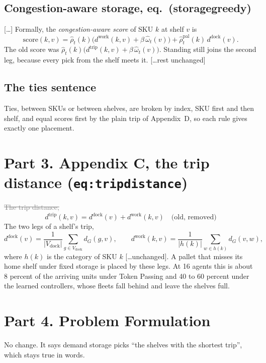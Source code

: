 \documentclass[11pt,a4paper]{article}
\newcommand{\new}[1]{\textcolor{newc}{#1}}
\newcommand{\old}[1]{\textcolor{gray}{\sout{#1}}}
\newenvironment{greenblock}{\color{newc}}{}
\begin{document}
\subsection*{Congestion-aware storage, eq.~(storagegreedy)}
[\dots] Formally, the \emph{congestion-aware score} of SKU $k$ at shelf $v$ is
\begin{equation*}
  \mathrm{score}(k,v) = \hat\rho_t(k)\bigl(d^{\mathrm{work}}(k,v) + \beta\,\hat\omega_t(v)\bigr)
  + \hat\rho^{\mathrm{pal}}_t(k)\,d^{\mathrm{dock}}(v) .
\end{equation*}
The old score was $\hat\rho_t(k)\bigl(d^{\mathrm{trip}}(k,v)+\beta\,\hat\omega_t(v)\bigr)$.
\new{Standing still joins the second leg, because every pick from the shelf
meets it.} [\dots rest unchanged]

\subsection*{The ties sentence}
Ties, between SKUs or between shelves, are broken by index, SKU first and
then shelf, \new{and equal scores first by the plain trip of
Appendix~D,} so each rule gives exactly one placement.

\section*{Part 3. Appendix C, the trip distance (\texttt{eq:tripdistance})}
\old{The trip distance,}
\begin{equation*}
d^{\mathrm{trip}}(k,v) = d^{\mathrm{dock}}(v) + d^{\mathrm{work}}(k,v) \quad\text{(old, removed)}
\end{equation*}
\new{The two legs of a shelf's trip,}
\begin{greenblock}
\begin{equation*}
  d^{\mathrm{dock}}(v) = \frac{1}{|V_{\mathrm{dock}}|} \sum_{g \in V_{\mathrm{dock}}} d_G(g, v),
  \qquad
  d^{\mathrm{work}}(k,v) = \frac{1}{|h(k)|} \sum_{w \in h(k)} d_G(v, w),
\end{equation*}
\end{greenblock}
where $h(k)$ is the category of SKU $k$ [\dots unchanged].
\new{A pallet that misses its home shelf under fixed storage is placed by
these legs. At 16 agents this is about 8 percent of the arriving units under
Token Passing and 40 to 60 percent under the learned controllers, whose
fleets fall behind and leave the shelves full.}

\section*{Part 4. Problem Formulation}
No change. It says demand storage picks ``the shelves with the shortest
trip'', which stays true in words.
\end{document}
